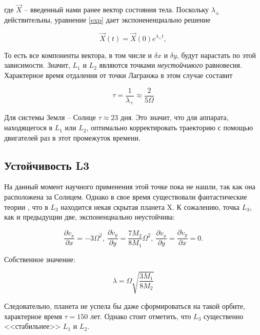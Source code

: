 \documentclass[12pt]{article}
\begin{document}
    где $\vec{X}$ -- введенный нами ранее вектор состояния тела. Поскольку 
    $\lambda_{\pm}$ действительны, уравнение \ref{exp} дает экспонененциально решение

    \begin{equation}
        \vec{X}(t) = \vec{X}(0)e^{\lambda_{+}t},
    \end{equation}

    То есть все компоненты вектора, в том числе и $\delta x$ и $\delta y$, будут нарастать
    по этой зависимости. Значит, $L_1$ и $L_2$ являются точками \textit{неустойчивого}
    равновесия.
    Характерное время отдаления от точки Лагранжа в этом случае составит

    \begin{equation}
        \tau = \frac{1}{\lambda_{+}} \approx \frac{2}{5\Omega}
    \end{equation}

    Для системы Земля -- Солнце $\tau \approx 23$ дня. Это значит, что для аппарата, находящегося
    в $L_1$ или $L_2$, оптимально корректировать траекторию с помощью двигателей раз в этот
    промежуток времени.

    \subsection{Устойчивость L3}
    На данный момент научного применения этой точке пока не нашли, так как она расположена
    за Солнцем. Однако в свое время существовали фантастические теории \cite{nasabrief}, что
    в $L_3$ находится некая скрытая планета X. К сожалению, точка $L_3$, как и предыдущии
    две, экспоненциально неустойчива:

    \begin{equation}
        \frac{\partial \dot{v}_x}{\partial x} = - 3\Omega^2,\ 
        \frac{\partial \dot{v}_y}{\partial y} = \frac{7M_2}{8M_1}\Omega^2,\
        \frac{\partial \dot{v}_x}{\partial y} = \frac{\partial \dot{v}_y}{\partial x} = 0. 
    \end{equation}

    Собственное значение:
    
    \begin{equation}
        \lambda = \Omega \sqrt{\frac{3M_1}{8M_2}}
    \end{equation}

    Следовательно, планета не успела бы даже сформироваться на такой орбите, характерное
    время $\tau = 150$ лет. Однако стоит отметить, что $L_3$ существенно <<стабильнее>>
    $L_1$ и $L_2$.
\end{document}
